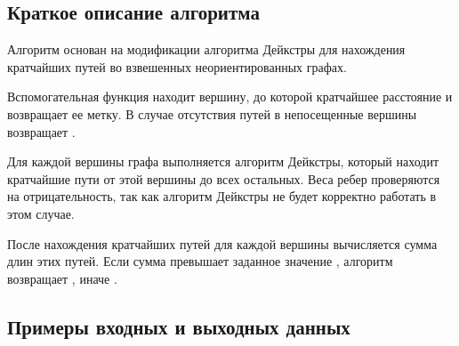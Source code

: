 \subsection{Краткое описание алгоритма}
Алгоритм основан на модификации алгоритма Дейкстры для нахождения кратчайших путей во
взвешенных неориентированных графах.

Вспомогательная функция 
находит вершину, до которой кратчайшее расстояние и возвращает ее метку.
В случае отсутствия путей в непосещенные вершины возвращает .

Для каждой вершины графа выполняется алгоритм Дейкстры, который находит кратчайшие
пути от этой вершины до всех остальных. Веса ребер проверяются на отрицательность,
так как алгоритм Дейкстры не будет корректно работать в этом случае.

После нахождения кратчайших путей для каждой вершины вычисляется сумма длин этих
путей. Если сумма превышает заданное значение , алгоритм возвращает ,
иначе .

\subsection{Примеры входных и выходных данных}
